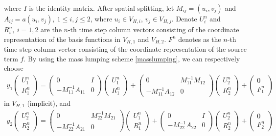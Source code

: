 \documentclass[preprint,12pt]{elsarticle}
\begin{document}
where $I$ is the identity matrix. 
After spatial splitting, let $M_{ij}=(u_i,v_j)$ and $A_{ij}=a(u_i,v_j),~1\leq i,j\leq2$, where $u_i\in V_{H,i}$, $v_j\in V_{H,j}$. Denote $U_i^n$ and $R_i^n,~i=1,2$ are the $n$-th time step column vectors consisting of the coordinate representation of the basis functions in $V_{H,1}$ and  $V_{H,2}$. $F^n$ denotes as the $n$-th time step column vector consisting of the coordinate representation of the source term $f$.
By using the mass lumping scheme \eqref{masslumping}, we can respectively choose
\begin{equation}\label{rk5}
\begin{aligned}
y_1\left(\begin{matrix}
    U^n_1\\R^n_1
\end{matrix}\right)=\left(\begin{matrix}
    0&I\\-M_{11}^{-1}A_{11}&0
\end{matrix}\right)\left(\begin{matrix}
    U^n_1\\R^n_1
\end{matrix}\right)+\left(\begin{matrix}
    0&M_{11}^{-1}M_{12}\\-M_{11}^{-1}A_{12}&0
\end{matrix}\right)\left(\begin{matrix}
    U^n_2\\R^n_2
\end{matrix}\right)+\left(\begin{matrix}
    0\\F_1^n
\end{matrix}\right)
\end{aligned}
\end{equation}
in $V_{H,1}$ (implicit), and
\begin{equation}\label{rk7}
\begin{aligned}
y_2\left(\begin{matrix}
    U^n_2\\R^n_2
\end{matrix}\right)=\left(\begin{matrix}
    0&M_{22}^{-1}M_{21}\\-M_{22}^{-1}A_{21}&0
\end{matrix}\right)\left(\begin{matrix}
    U^n_1\\R^n_1
\end{matrix}\right)+\left(\begin{matrix}
    0&I\\-M_{22}^{-1}A_{22}&0
\end{matrix}\right)\left(\begin{matrix}
    U^n_2\\R^n_2
\end{matrix}\right)+\left(\begin{matrix}
    0\\F_2^n
\end{matrix}\right)
\end{aligned}
\end{equation}
\end{document}
